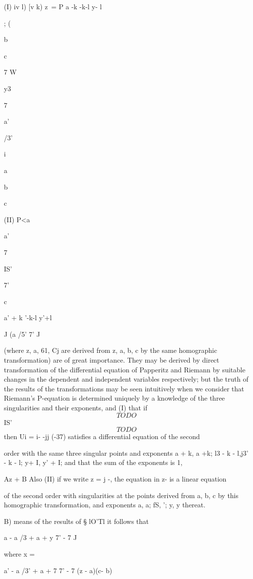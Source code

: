 (I) iv l) [v k) z\ = P a -k -k-l y- l

; (

b

c

7 W

y3

7

a'

/3'

i

a

b

c

(II) P<a

a'



7

IS'

7'

c

a' + k '-k-l y'+l

J (a /5' 7' J

(where z, a, 61, Cj are derived from z, a, b, c by the same
homographic transformation) are of great importance. They may be
derived by direct transformation of the differential equation of
Papperitz and Riemann by suitable changes in the dependent and
independent variables respectively; but the truth of the results of
the transformations may be seen intuitively when we consider that
Riemann's P-equation is determined uniquely by a knowledge of the
three singularities and their exponents, and (I) that if
$$
TODO
$$
IS'
$$
TODO
$$
then Ui = i- -jj (-37) satisfies a differential equation of the second

order with the same three singular points and exponents a + k, a +k;
l3 - k - l,j3' - k - l; y+ I, y' + I; and that the sum of the
exponents is 1,

Az + B Also (II) if we write z = j -, the equation in z- is a linear
equation

of the second order with singularities at the points derived from a,
b, c by this homographic transformation, and exponents a, a; fS, ';
y, y thereat.

%
%


B) means of the results of § lO'Tl it follows that

 a - a /3 + a + y 7' - 7 J

where x =

a' - a /3' + a + 7 7' - 7 (z - a)(c- b)

